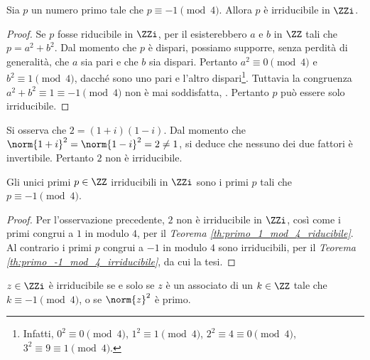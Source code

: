 \begin{theorem}
    \label{th:primo_-1_mod_4_irriducibile}
    Sia $p$ un numero primo tale che $p \equiv -1 \pmod4$. Allora
    $p$ è irriducibile in $\ZZi$.
\end{theorem}

\begin{proof}
    Se $p$ fosse riducibile in
    $\ZZi$, per il  esisterebbero $a$ e $b$
    in $\ZZ$ tali che $p=a^2+b^2$. Dal momento che $p$ è dispari,
    possiamo supporre, senza perdità di generalità, che
    $a$ sia pari e che $b$ sia dispari. Pertanto $a^2 \equiv 0 \pmod 4$ e $b^2 \equiv 1 \pmod 4$, dacché sono uno pari e l'altro dispari\footnote{Infatti, $0^2 \equiv 0
            \pmod4$, $1^2 \equiv 1 \pmod4$, $2^2 \equiv 4 \equiv 0 \pmod 4$,
        $3^2 \equiv 9 \equiv 1 \pmod 4$.}. Tuttavia la congruenza
    $a^2+b^2 \equiv 1 \equiv -1 \pmod4$ non è mai soddisfatta,
    \Lightning{}. Pertanto $p$ può essere solo irriducibile.
\end{proof}

\begin{remark*}
    Si osserva che $2=(1+i)(1-i)$. Dal momento che $\norm{1+i}^2=
        \norm{1-i}^2=2\neq1$, si deduce che nessuno dei due fattori
    è invertibile. Pertanto $2$ non è irriducibile.
\end{remark*}

\begin{proposition}
    \label{prop:irriducibili_zz_zzi}
    Gli unici primi $p \in \ZZ$ irriducibili in $\ZZi$ sono i primi $p$ tali
    che $p \equiv -1 \pmod4$.
\end{proposition}

\begin{proof}
    Per l'osservazione precedente, $2$ non è irriducibile in $\ZZi$,
    così come i primi congrui a $1$ in modulo $4$,
    per il \textit{Teorema \ref{th:primo_1_mod_4_riducibile}}. Al
    contrario i primi $p$ congrui a $-1$ in modulo $4$ sono
    irriducibili, per il \textit{Teorema \ref{th:primo_-1_mod_4_irriducibile}}, da cui la tesi.
\end{proof}

\begin{theorem}
    $z \in \ZZi$ è irriducibile se e solo se $z$ è un associato di un $k \in \ZZ$ tale che $k \equiv -1 \pmod 4$, o se $\norm{z}^2$ è primo.
\end{theorem}

